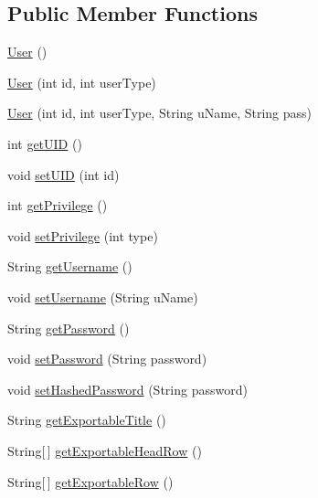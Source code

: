 \subsection*{Public Member Functions}
\begin{DoxyCompactItemize}
\item 
\hyperlink{classw3se_1_1_model_1_1_base_1_1_user_a7175bdcc32c8afe93a4eb560d6a1a3db}{User} ()
\item 
\hyperlink{classw3se_1_1_model_1_1_base_1_1_user_a4459f10b6c304b1f6175e643b1214f1b}{User} (int id, int user\-Type)
\item 
\hyperlink{classw3se_1_1_model_1_1_base_1_1_user_a10d5475259d829dd44c537aa6513b684}{User} (int id, int user\-Type, String u\-Name, String pass)
\item 
int \hyperlink{classw3se_1_1_model_1_1_base_1_1_user_a91b9dd2fc9fd8d82bc950c872c1c1cf1}{get\-U\-I\-D} ()
\item 
void \hyperlink{classw3se_1_1_model_1_1_base_1_1_user_a5fdbd0b68b1dac6f5e6966436b37dbea}{set\-U\-I\-D} (int id)
\item 
int \hyperlink{classw3se_1_1_model_1_1_base_1_1_user_aa250fbea599531feb9f40bd8220e2c6e}{get\-Privilege} ()
\item 
void \hyperlink{classw3se_1_1_model_1_1_base_1_1_user_aebf312c2aa41e6fff2e99a8e885e7abd}{set\-Privilege} (int type)
\item 
String \hyperlink{classw3se_1_1_model_1_1_base_1_1_user_adfc39b6915195d1b070bd2c2b89cf28a}{get\-Username} ()
\item 
void \hyperlink{classw3se_1_1_model_1_1_base_1_1_user_a2b1167162bee4e33d600f54f1fe0eb92}{set\-Username} (String u\-Name)
\item 
String \hyperlink{classw3se_1_1_model_1_1_base_1_1_user_a69374e5be9ddf6c3fed5a0981c85938e}{get\-Password} ()
\item 
void \hyperlink{classw3se_1_1_model_1_1_base_1_1_user_aa092dd8de4cced9120f39f45ddd1e396}{set\-Password} (String password)
\item 
void \hyperlink{classw3se_1_1_model_1_1_base_1_1_user_ab1ace76549f4ad17317fd9eaef7dda00}{set\-Hashed\-Password} (String password)
\item 
String \hyperlink{classw3se_1_1_model_1_1_base_1_1_user_ab142cfb56ac95f53af431da8d51a0e1e}{get\-Exportable\-Title} ()
\item 
String\mbox{[}$\,$\mbox{]} \hyperlink{classw3se_1_1_model_1_1_base_1_1_user_a10894d951b95c22bac3bb6ea5282145b}{get\-Exportable\-Head\-Row} ()
\item 
String\mbox{[}$\,$\mbox{]} \hyperlink{classw3se_1_1_model_1_1_base_1_1_user_a0248b8cb40d7c30989c86e2de16578d6}{get\-Exportable\-Row} ()
\end{DoxyCompactItemize}
